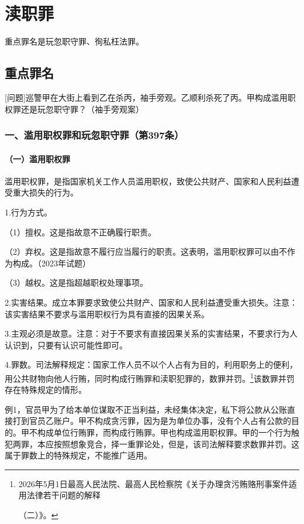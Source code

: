 \chapter{渎职罪}

\begin{EditionOpeningPanel}
重点罪名是玩忽职守罪、徇私枉法罪。
\end{EditionOpeningPanel}

\section{重点罪名}

[问题]巡警甲在大街上看到乙在杀丙，袖手旁观。乙顺利杀死了丙。甲构成滥用职权罪还是玩忽职守罪？（袖手旁观案）

\subsection*{一、滥用职权罪和玩忽职守罪（第397条）}

\subsubsection*{（一）滥用职权罪}

滥用职权罪，是指国家机关工作人员滥用职权，致使公共财产、国家和人民利益遭受重大损失的行为。

1.行为方式。

（1）擅权。这是指故意不正确履行职责。

（2）弃权。这是指故意不履行应当履行的职责。这表明，滥用职权罪可以由不作为构成。（2023年试题）

（3）越权。这是指超越职权处理事项。

2.实害结果。成立本罪要求致使公共财产、国家和人民利益遭受重大损失。注意：该实害结果不要求与滥用职权行为具有直接的因果关系。

3.主观必须是故意。注意：对于不要求有直接因果关系的实害结果，不要求行为人认识到，只要有认识可能性即可。

4.罪数。司法解释规定：国家工作人员不以个人占有为目的，利用职务上的便利，用公共财物向他人行贿，同时构成行贿罪和渎职犯罪的，数罪并罚。\footnote{2026年5月1日最高人民法院、最高人民检察院《关于办理贪污贿赂刑事案件适用法律若干问题的解释

（二）》。}该数罪并罚存在特殊规定的情形。

例1，官员甲为了给本单位谋取不正当利益，未经集体决定，私下将公款从公账直接打到官员乙账户。甲不构成贪污罪，因为是为单位办事，没有个人占有公款的目的。甲不构成单位行贿罪，而构成行贿罪。甲也构成滥用职权罪。甲的一个行为触犯两罪，本应按照想象竞合，择一重罪论处，但是，该司法解释要求数罪并罚。这属于罪数上的特殊规定，不能推广适用。

